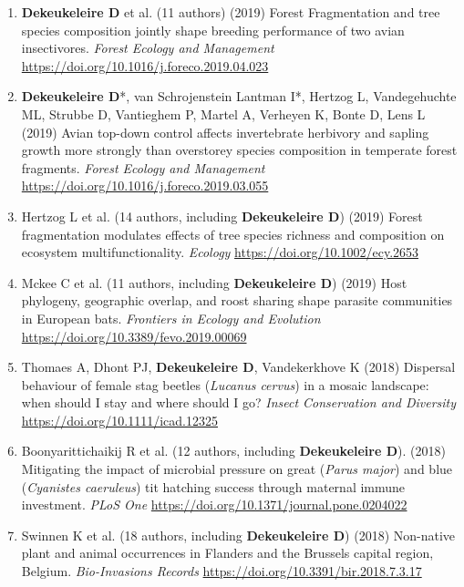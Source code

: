 \documentclass[10pt, twoside]{book} %
\begin{document}
\begin{enumerate}
		\item \textbf{Dekeukeleire D} et al. (11 authors) (2019) Forest Fragmentation and tree species composition jointly shape breeding performance of two avian insectivores. \textit{Forest Ecology and Management} \url{https://doi.org/10.1016/j.foreco.2019.04.023}
		
		\item \textbf{Dekeukeleire D}*, van Schrojenstein Lantman I*, Hertzog L, Vandegehuchte ML, Strubbe D, Vantieghem P, Martel A, Verheyen K, Bonte D, Lens L (2019) Avian top-down control affects invertebrate herbivory and sapling growth more strongly than overstorey species composition in temperate forest fragments. \textit{Forest Ecology and Management} \url{https://doi.org/10.1016/j.foreco.2019.03.055}
		
		\item Hertzog L et al. (14 authors, including \textbf{Dekeukeleire D}) (2019) Forest fragmentation modulates effects of tree species richness and composition on ecosystem multifunctionality. \textit{Ecology} \url{https://doi.org/10.1002/ecy.2653}
		
		\item Mckee C et al. (11 authors, including \textbf{Dekeukeleire D}) (2019) Host phylogeny, geographic overlap, and roost sharing shape parasite communities in European bats. \textit{Frontiers in Ecology and Evolution} \url{https://doi.org/10.3389/fevo.2019.00069}
		
		\item Thomaes A, Dhont PJ,\textbf{ Dekeukeleire D}, Vandekerkhove K (2018) Dispersal behaviour of female stag beetles (\textit{Lucanus cervus}) in a mosaic landscape: when should I stay and where should I go? \textit{Insect Conservation and Diversity} \url{https://doi.org/10.1111/icad.12325}
		
		\item Boonyarittichaikij R et al. (12 authors, including \textbf{Dekeukeleire D}). (2018) Mitigating the impact of microbial pressure on great (\textit{Parus major}) and blue (\textit{Cyanistes caeruleus}) tit hatching success through maternal immune investment. \textit{PLoS One} \url{https://doi.org/10.1371/journal.pone.0204022}
		
		\item Swinnen K et al. (18 authors, including \textbf{Dekeukeleire D}) (2018) Non-native plant and animal occurrences in Flanders and the Brussels capital region, Belgium. \textit{Bio-Invasions Records} \url{https://doi.org/10.3391/bir.2018.7.3.17}
		

\end{enumerate}
\end{document}
